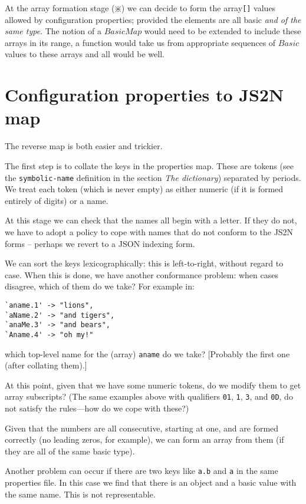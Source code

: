 \documentclass[a4paper,twoside,12pt]{article}
\begin{document}
At the array formation stage ($\divideontimes$) we can decide to form the array\texttt{[]} values allowed by configuration properties; provided the elements are all basic \emph{and of the same type}. The notion of a $BasicMap$ would need to be extended to include these arrays in its range, a function would take us from appropriate sequences of $Basic$ values to these arrays and all would be well.
 
\section{Configuration properties to JS2N map}
The reverse map is both easier and trickier.

The first step is to collate the keys in the properties map. These are tokens (see the \texttt{symbolic-name} definition in the section \emph{The dictionary}) separated by periods. We treat each token (which is never empty) as either numeric (if it is formed entirely of digits) or a name.

At this stage we can check that the names all begin with a letter. If they do not, we have to adopt a policy to cope with names that do not conform to the JS2N forms -- perhaps we revert to a JSON indexing form.

We can sort the keys lexicographically: this is left-to-right, without regard to case.  When this is done, we have another conformance problem: when cases disagree, which of them do we take? For example in:
\begin{verbatim}
`aname.1' -> "lions",
`aName.2' -> "and tigers",
`anaMe.3' -> "and bears",
`Aname.4' -> "oh my!"
\end{verbatim}
which top-level name for the (array) \texttt{aname} do we take? [Probably the first one (after collating them).]

At this point, given that we have some numeric tokens, do we modify them to get array subscripts? (The same examples above with qualifiers \texttt{01}, \texttt{1}, \texttt{3}, and \texttt{0D}, do not satisfy the rules---how do we cope with these?)

Given that the numbers are all consecutive, starting at one, and are formed correctly (no leading zeros, for example), we can form an array from them (if they are all of the same basic type).

Another problem can occur if there are two keys like \texttt{a.b} and \texttt{a} in the same properties file. In this case we find that there is an object and a basic value with the same name. This is not representable.
\end{document}
